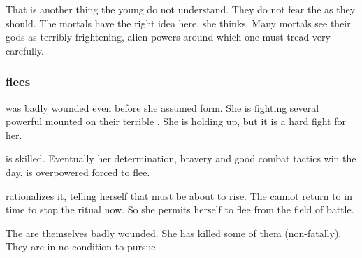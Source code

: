 That is another thing the young \resphain{} do not understand. 
They do not fear the \banes{} as they should. 
The mortals have the right idea here, she thinks. 
Many mortals see their gods as terribly frightening, alien powers around which one must tread very carefully.

\begin{prose}
\end{prose}





\subsubsection{\Nzessuacrith flees}
\Nzessuacrith was badly wounded even before she assumed \draconian form.
She is fighting several powerful \resphain mounted on their terrible \umbrae. 
She is holding up, but it is a hard fight for her. 

\Achsah is skilled. 
Eventually her determination, bravery and good combat tactics win the day. 
\Nzessuacrith is overpowered forced to flee. 

\Nzessuacrith rationalizes it, telling herself that \Nithdornazsh must be about to rise. 
The \resphain cannot return to \Malcur in time to stop the ritual now. 
So she permits herself to flee from the field of battle. 

The \resphain are themselves badly wounded.
She has killed some of them (non-fatally).
They are in no condition to pursue. 





% 
% 
% 





